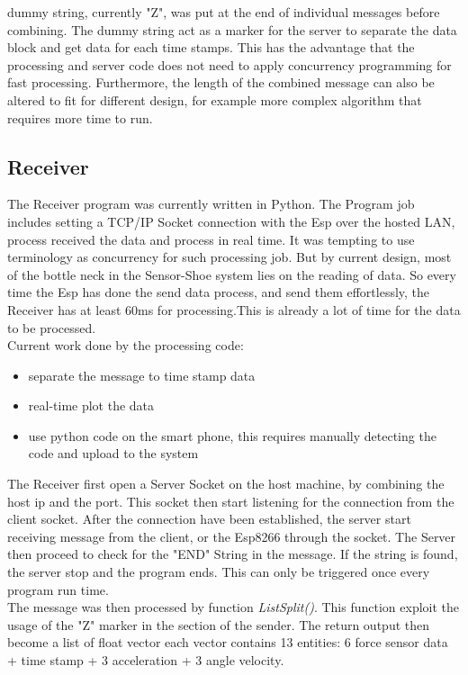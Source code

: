 \documentclass[12 pt, a4paper]{thesis}
\begin{document}
dummy string, currently "Z", was put at the end of individual messages before combining. The dummy string act as a marker for the server to separate the data block and get data for each time stamps. This has the advantage that the processing and server code does not need to apply concurrency programming for fast processing. Furthermore, the length of the combined message can also be altered to fit for different design, for example more complex algorithm that requires more time to run.   
\subsection{Receiver}
The Receiver program was currently written in Python. The Program job includes setting a TCP/IP Socket connection with the Esp over the hosted LAN, process received the data and process in real time. It was tempting to use terminology as concurrency for such processing job. But by current design, most of the bottle neck in the Sensor-Shoe system lies on the reading of data. So every time the Esp has done the send data process, and send them effortlessly, the Receiver has at least 60ms for processing.This is already a lot of time for the data to be processed.\\
Current work done by the processing code:
\begin{itemize}
\item{separate the message to time stamp data}
\item{real-time plot the data}
\item{use python code on the smart phone, this requires manually detecting the code and upload to the system}
\end{itemize}
The Receiver first open a Server Socket on the host machine, by combining the host ip and the port. This socket then start listening for the connection from the client socket. After the connection have been established, the server start receiving message from the client, or the Esp8266 through the socket. The Server then proceed to check for the "END" String in the message. If the string is found, the server stop and the program ends. This can only be triggered once every program run time.\\
The message was then processed by function \emph{ListSplit()}. This function exploit the usage of the "Z" marker in the section of the sender. The return output then become a list of float vector each vector contains 13 entities: 6 force sensor data + time stamp + 3 acceleration + 3 angle velocity.\\
\end{document}
